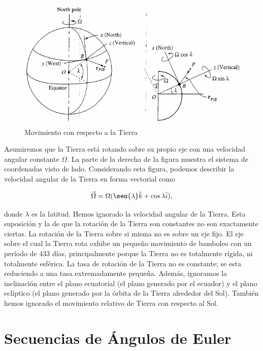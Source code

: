 \documentclass[a4paper,10pt]{article}
\numberwithin{equation}{section}
\begin{document}
\begin{figure}[H]
 \center
 \includegraphics[scale=0.4]{apendice1fig1}
 \caption{Movimiento con respecto a la Tierra}
  \label{fig:apendice1fig1}
\end{figure}

Asumiremos que la Tierra está rotando sobre su propio eje con una velocidad angular 
constante $\Omega$. La parte de la derecha de la figura  
muestra el sistema de coordenadas visto de lado. Considerando esta figura, podemos 
describir la velocidad angular de la Tierra en forma vectorial como

\begin{equation}
 \vec{\Omega} = \Omega(\sen{\lambda}\hat{k}+\cos{\lambda}\hat{i}),
 \label{eq:velAngTierra1}
\end{equation}

donde $\lambda$ es la latitud. Hemos ignorado la velocidad angular de la Tierra. Esta 
suposición y la de que la rotación de la Tierra son constantes no son exactamente 
ciertas. La rotación de la Tierra sobre si misma no es sobre un eje fijo. El eje 
sobre el cual la Tierra rota exhibe un pequeño movimiento de bamboleo con un 
período de 433 días, principalmente porque la Tierra no es totalmente rígida, ni 
totalmente esférica. La tasa de rotación de la Tierra no es constante; se esta 
reduciendo a una tasa extremadamente pequeña. Además, ignoramos la inclinación 
entre el plano ecuatorial (el plano generado por el ecuador) y el plano eclíptico 
(el plano generado por la órbita de la Tierra alrededor del Sol). También hemos 
ignorado el movimiento relativo de Tierra con respecto al Sol.

\newpage

\section{Secuencias de Ángulos de Euler} \label{app:apendice2}
\end{document}
